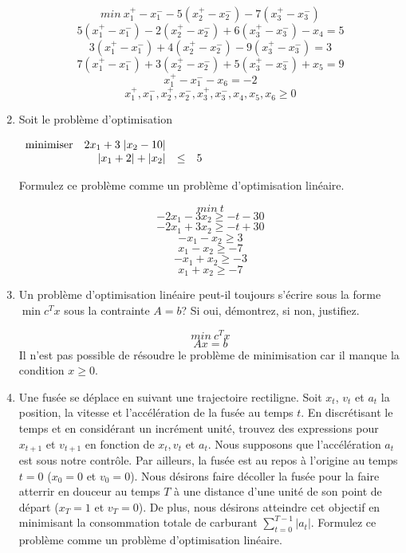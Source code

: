 \begin{enumerate}
    \begin{solution}
      $$min~x_{1}^{+} - x_{1}^{-}-5(x_{2}^{+} - x_{2}^{-})-7(x_{3}^{+} - x_{3}^{-})$$
      $$5(x_{1}^{+} - x_{1}^{-})-2(x_{2}^{+} - x_{2}^{-})+6(x_{3}^{+} - x_{3}^{-}) - x_{4}= 5$$
      $$3(x_{1}^{+} - x_{1}^{-})+4(x_{2}^{+} - x_{2}^{-})-9(x_{3}^{+} - x_{3}^{-}) = 3$$
      $$7(x_{1}^{+} - x_{1}^{-})+3(x_{2}^{+} - x_{2}^{-})+5(x_{3}^{+} - x_{3}^{-}) + x_{5} = 9$$
      $$x_{1}^{+} - x_{1}^{-} - x_{6} = -2 $$
      $$x_{1}^{+}, x_{1}^{-}, x_{2}^{+}, x_{2}^{-}, x_{3}^{+}, x_{3}^{-}, x_{4}, x_{5}, x_{6} \geq 0 $$
    \end{solution}

  \item Soit le problème d'optimisation

    $
    \begin{array}{lrcr}
      \mbox{minimiser}   &  2x_1+3 \; | x_2-10|\\
      & |x_1+2| + |x_2| & \leq & 5
    \end{array}
    $

    Formulez ce problème comme un problème d'optimisation linéaire.

    \begin{solution}
      $$min~t$$
      $$-2x_{1}-3x_{2} \geq -t -30$$
      $$-2x_{1}+3x_{2} \geq -t +30$$
      $$-x_{1} - x_{2} \geq 3$$
      $$x_{1} - x_{2} \geq -7$$
      $$-x_{1} + x_{2} \geq -3$$
      $$x_{1} + x_{2} \geq -7 $$
    \end{solution}


  \item Un problème d'optimisation linéaire peut-il toujours s'écrire sous la forme $\min c^Tx$ sous la contrainte $A = b$? Si oui, démontrez, si non, justifiez.

    \begin{solution}
      $$min~c^{T}x$$
      $$Ax = b$$
      Il n'est pas possible de résoudre le problème de minimisation car il manque la condition $x \geq 0$.
    \end{solution}

  \item Une fusée se déplace en suivant une trajectoire rectiligne. Soit $x_t$, $v_t$
    et $a_t$ la position, la vitesse et l'accélération de la fusée au temps $t$. En discrétisant le temps et en considérant un incrément
    unité, trouvez des expressions pour $x_{t+1}$ et $v_{t+1}$ en fonction de $x_t, v_t$ et $a_t$. Nous supposons que l'accélération $a_t$ est sous notre
    contrôle. Par ailleurs, la fusée est au repos à l'origine au temps
    $t=0$ ($x_0=0$ et
    $v_0=0$). Nous désirons faire décoller la fusée pour la faire atterrir  en douceur au temps $T$ à une
    distance d'une unité de son point de départ ($x_T=1$ et $v_T=0$). De plus, nous désirons atteindre cet
    objectif en minimisant la consommation totale de carburant
    $\sum_{t=0}^{T-1} |a_t|$.  Formulez ce problème comme un problème d'optimisation linéaire.


\end{enumerate}
